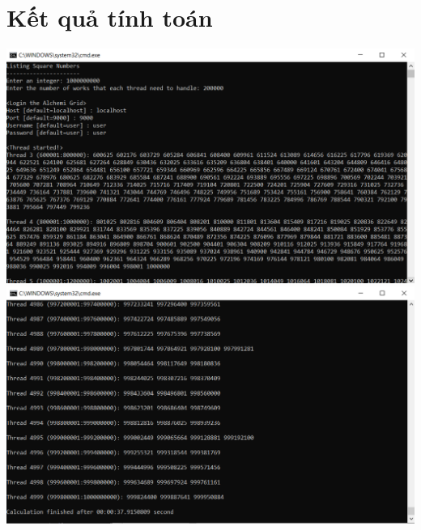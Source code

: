\documentclass[12pt,a4paper]{report}
\begin{document}
\section{Kết quả tính toán}
\begin{center}
\includegraphics[scale=.6]{./Figures/SquareNumbers/Result_01}
\includegraphics[scale=.6]{./Figures/SquareNumbers/Result_02}
\clearpage
\end{center}
\end{document}
